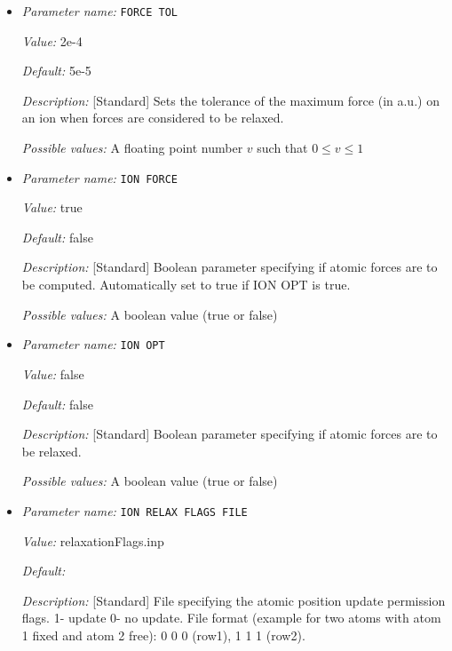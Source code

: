 \begin{itemize}
{\it Possible values:} A boolean value (true or false)
\item {\it Parameter name:} {\tt FORCE TOL}
\label{parameters:Geometry/Optimization/FORCE TOL}
\label{parameters:Geometry/Optimization/FORCE_20TOL}


{\it Value:} 2e-4


{\it Default:} 5e-5


{\it Description:} [Standard] Sets the tolerance of the maximum force (in a.u.) on an ion when forces are considered to be relaxed.


{\it Possible values:} A floating point number $v$ such that $0 \leq v \leq 1$
\item {\it Parameter name:} {\tt ION FORCE}
\label{parameters:Geometry/Optimization/ION FORCE}
\label{parameters:Geometry/Optimization/ION_20FORCE}


{\it Value:} true


{\it Default:} false


{\it Description:} [Standard] Boolean parameter specifying if atomic forces are to be computed. Automatically set to true if ION OPT is true.


{\it Possible values:} A boolean value (true or false)
\item {\it Parameter name:} {\tt ION OPT}
\label{parameters:Geometry/Optimization/ION OPT}
\label{parameters:Geometry/Optimization/ION_20OPT}


{\it Value:} false


{\it Default:} false


{\it Description:} [Standard] Boolean parameter specifying if atomic forces are to be relaxed.


{\it Possible values:} A boolean value (true or false)
\item {\it Parameter name:} {\tt ION RELAX FLAGS FILE}
\label{parameters:Geometry/Optimization/ION RELAX FLAGS FILE}
\label{parameters:Geometry/Optimization/ION_20RELAX_20FLAGS_20FILE}


{\it Value:} relaxationFlags.inp


{\it Default:} 


{\it Description:} [Standard] File specifying the atomic position update permission flags. 1- update 0- no update. File format (example for two atoms with atom 1 fixed and atom 2 free): 0 0 0 (row1), 1 1 1 (row2).



\end{itemize}
